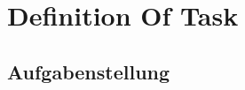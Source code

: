 \chapter{Definition Of Task}
\label{sec:taskdef}

\section{Aufgabenstellung}
\label{sec:Aufgabe}




